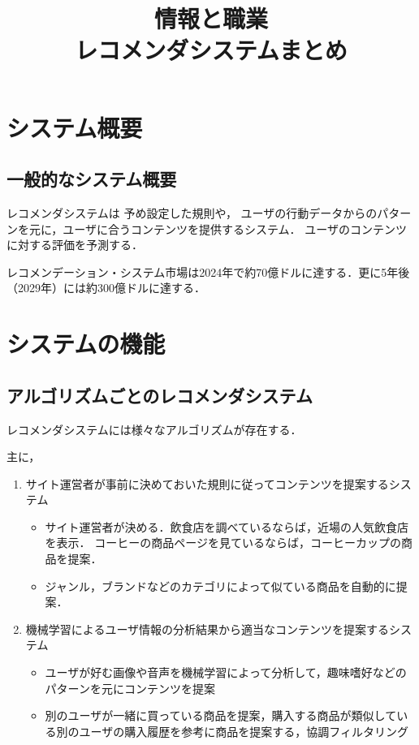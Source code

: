 \documentclass{jlreq}
\title{情報と職業 \\ \vspace{0.5cm} レコメンダシステムまとめ}
\begin{document}
\maketitle

\section{システム概要}
\subsection{一般的なシステム概要}
レコメンダシステムは
予め設定した規則や，
ユーザの行動データからのパターンを元に，ユーザに合うコンテンツを提供するシステム．
ユーザのコンテンツに対する評価を予測する．

レコメンデーション・システム市場は2024年で約70億ドルに達する．更に5年後（2029年）には約300億ドルに達する．

\section{システムの機能}
\subsection{アルゴリズムごとのレコメンダシステム}
レコメンダシステムには様々なアルゴリズムが存在する．

主に，
\begin{enumerate}
    \item サイト運営者が事前に決めておいた規則に従ってコンテンツを提案するシステム
    \begin{itemize}
        \item サイト運営者が決める．飲食店を調べているならば，近場の人気飲食店を表示．
        コーヒーの商品ページを見ているならば，コーヒーカップの商品を提案．
        \item ジャンル，ブランドなどのカテゴリによって似ている商品を自動的に提案．
    \end{itemize}
    \item 機械学習によるユーザ情報の分析結果から適当なコンテンツを提案するシステム
    \begin{itemize}
        \item ユーザが好む画像や音声を機械学習によって分析して，趣味嗜好などのパターンを元にコンテンツを提案
        \item 別のユーザが一緒に買っている商品を提案，購入する商品が類似している別のユーザの購入履歴を参考に商品を提案する，協調フィルタリング
    \end{itemize}
\end{enumerate}
\end{document}
